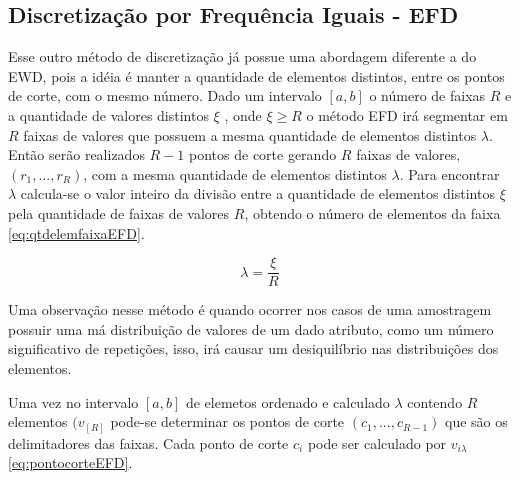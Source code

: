 


\subsection{Discretização por Frequência Iguais - EFD}\label{subsec:ewd}

Esse outro método de discretização já possue uma abordagem diferente a do EWD, pois a idéia é manter a quantidade de elementos distintos, entre os pontos de corte, com o mesmo número. Dado um intervalo ${[a,b]}$ o número de faixas ${R}$ e a quantidade de valores distintos ${\xi}$ , onde ${\xi \geqslant R}$ o método EFD irá segmentar em  ${R}$ faixas de valores que possuem a mesma quantidade de elementos distintos ${\lambda}$. Então serão realizados ${R-1}$ pontos de corte gerando ${R}$ faixas de valores, ${(r_1,...,r_R)}$, com a mesma quantidade de elementos distintos ${\lambda}$. Para encontrar ${\lambda}$ calcula-se o valor inteiro da divisão entre a quantidade de elementos distintos ${\xi}$ pela quantidade de faixas de valores ${R}$, obtendo o número de elementos da faixa \ref{eq:qtdelemfaixaEFD}.

\begin{equation}
\lambda = \frac{\xi}{R}
 \label{eq:qtdelemfaixaEFD}
\end{equation}

Uma observação nesse método é quando ocorrer nos casos de uma amostragem possuir uma má distribuição de valores de um dado atributo, como um número significativo de repetições, isso, irá causar um desiquilíbrio nas distribuições dos elementos.

Uma vez no intervalo ${[a,b]}$ de elemetos ordenado e calculado ${\lambda}$ contendo ${R}$ elementos ${(v_{[R]}}$  pode-se determinar os pontos de corte ${(c_1,...,c_{R-1})}$ que são os delimitadores das faixas. Cada ponto de corte ${c_i}$ pode ser calculado por ${v_{i\lambda}}$ \ref{eq:pontocorteEFD}.

